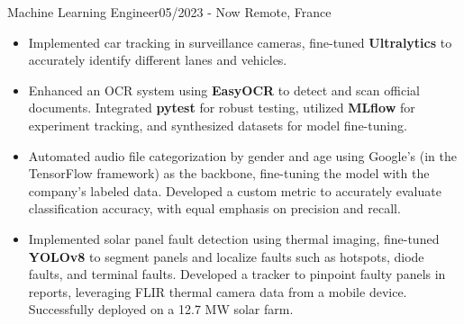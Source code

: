 \resumeSubheadingReza
{Machine Learning Engineer}{05/2023 - Now}
{}{Remote, France}
{
  \vspace{-12pt}
  \begin{itemize}
    \item {Implemented car tracking in surveillance cameras, fine-tuned \textbf{Ultralytics} to accurately identify different lanes and vehicles.}
    \item {Enhanced an OCR system using \textbf{EasyOCR} to detect and scan official documents. Integrated \textbf{pytest} for robust testing, utilized \textbf{MLflow} for experiment tracking, and synthesized datasets for model fine-tuning.}
    \item {Automated audio file categorization by gender and age using Google's  (in the TensorFlow framework) as the backbone, fine-tuning the model with the company's labeled data. Developed a custom metric to accurately evaluate classification accuracy, with equal emphasis on precision and recall.}
    \item {Implemented solar panel fault detection using thermal imaging, fine-tuned \textbf{YOLOv8} to segment panels and localize faults such as hotspots, diode faults, and terminal faults. Developed a tracker to pinpoint faulty panels in reports, leveraging FLIR thermal camera data from a mobile device. Successfully deployed on a 12.7 MW solar farm.}
  \end{itemize}
}
